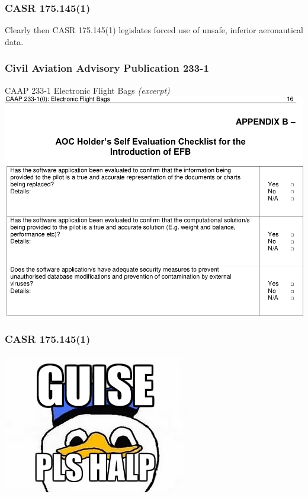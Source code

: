 \begin{frame}
\frametitle{CASR 175.145(1)}
\begin{block}{Clearly then}
CASR 175.145(1) legislates forced use of unsafe, inferior aeronautical data.
\end{block}
\end{frame}

\begin{frame}
\frametitle{Civil Aviation Advisory Publication 233-1}
\begin{block}{CAAP 233-1 Electronic Flight Bags \emph{(excerpt)}}
\includegraphics[height=0.6\textheight]{image/caap-233.png}
\end{block}
\end{frame}

\begin{frame}
\frametitle{CASR 175.145(1)}
\begin{center}
\includegraphics[height=0.5\textheight]{image/pls-halp.png}
\end{center}
\end{frame}

